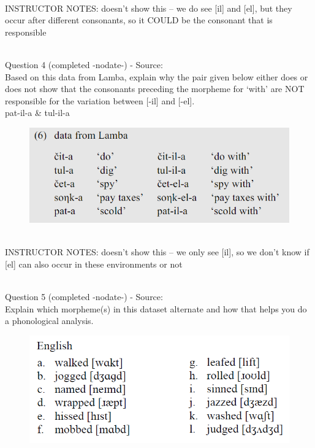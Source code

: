 \documentclass[12pt]{article}
\begin{document}
~\\
INSTRUCTOR NOTES: doesn't show this -- we do see [il] and [el], but they occur after different consonants, so it COULD be the consonant that is responsible


~\\

{\large Question 4} (completed -nodate-) - Source: \\

Based on this data from Lamba, explain why the pair given below either does or does not show that the consonants preceding the morpheme for `with' are NOT responsible for the variation between [-il] and [-el].\\

pat-il-a \& tul-il-a

\begin{figure}[H]
\includegraphics{../images/peng119_lamba.png}
\end{figure}

~\\
INSTRUCTOR NOTES: doesn't show this -- we only see [il], so we don't know if [el] can also occur in these environments or not


~\\

{\large Question 5} (completed -nodate-) - Source: \\

Explain which morpheme(s) in this dataset alternate and how that helps you do a phonological analysis.\\

\begin{figure}[H]
\includegraphics{../images/english_past.png}
\end{figure}
\end{document}
